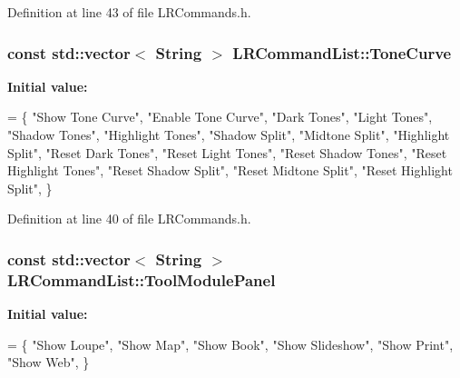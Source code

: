 Definition at line 43 of file L\+R\+Commands.\+h.

\subsubsection[{\texorpdfstring{Tone\+Curve}{ToneCurve}}]{\setlength{\rightskip}{0pt plus 5cm}const std\+::vector$<$ String $>$ L\+R\+Command\+List\+::\+Tone\+Curve\hspace{0.3cm}{\ttfamily [static]}}\hypertarget{class_l_r_command_list_a40a38744d580f1999e6cb959e334bceb}{}\label{class_l_r_command_list_a40a38744d580f1999e6cb959e334bceb}
{\bfseries Initial value\+:}
\begin{DoxyCode}
= \{
    \textcolor{stringliteral}{"Show Tone Curve"},
    \textcolor{stringliteral}{"Enable Tone Curve"},
    \textcolor{stringliteral}{"Dark Tones"},
    \textcolor{stringliteral}{"Light Tones"},
    \textcolor{stringliteral}{"Shadow Tones"},
    \textcolor{stringliteral}{"Highlight Tones"},
    \textcolor{stringliteral}{"Shadow Split"},
    \textcolor{stringliteral}{"Midtone Split"},
    \textcolor{stringliteral}{"Highlight Split"},
    \textcolor{stringliteral}{"Reset Dark Tones"},
    \textcolor{stringliteral}{"Reset Light Tones"},
    \textcolor{stringliteral}{"Reset Shadow Tones"},
    \textcolor{stringliteral}{"Reset Highlight Tones"},
    \textcolor{stringliteral}{"Reset Shadow Split"},
    \textcolor{stringliteral}{"Reset Midtone Split"},
    \textcolor{stringliteral}{"Reset Highlight Split"},
\}
\end{DoxyCode}


Definition at line 40 of file L\+R\+Commands.\+h.

\subsubsection[{\texorpdfstring{Tool\+Module\+Panel}{ToolModulePanel}}]{\setlength{\rightskip}{0pt plus 5cm}const std\+::vector$<$ String $>$ L\+R\+Command\+List\+::\+Tool\+Module\+Panel\hspace{0.3cm}{\ttfamily [static]}}\hypertarget{class_l_r_command_list_a3a2bf6260b3a0611793e9a2d501ecc60}{}\label{class_l_r_command_list_a3a2bf6260b3a0611793e9a2d501ecc60}
{\bfseries Initial value\+:}
\begin{DoxyCode}
= \{
    \textcolor{stringliteral}{"Show Loupe"},
    \textcolor{stringliteral}{"Show Map"},
    \textcolor{stringliteral}{"Show Book"},
    \textcolor{stringliteral}{"Show Slideshow"},
    \textcolor{stringliteral}{"Show Print"},
    \textcolor{stringliteral}{"Show Web"},
\}
\end{DoxyCode}


